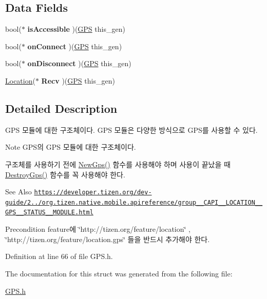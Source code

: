 \subsection*{Data Fields}
\begin{DoxyCompactItemize}
\item 
\hypertarget{struct__gps_ab422e6e9531279ce2cf7836d6fdad824}{bool($\ast$ {\bfseries is\-Accessible} )(\hyperlink{struct__gps}{G\-P\-S} this\-\_\-gen)}\label{struct__gps_ab422e6e9531279ce2cf7836d6fdad824}

\item 
\hypertarget{struct__gps_ac1e7688363e326df6919afc5d8cc848c}{bool($\ast$ {\bfseries on\-Connect} )(\hyperlink{struct__gps}{G\-P\-S} this\-\_\-gen)}\label{struct__gps_ac1e7688363e326df6919afc5d8cc848c}

\item 
\hypertarget{struct__gps_a7ad2cd5581984147767aa12d71a7ff74}{bool($\ast$ {\bfseries on\-Disconnect} )(\hyperlink{struct__gps}{G\-P\-S} this\-\_\-gen)}\label{struct__gps_a7ad2cd5581984147767aa12d71a7ff74}

\item 
\hypertarget{struct__gps_a983b023f987a119a6df5c57b8a998f61}{\hyperlink{GPS_8h_d1/d4f/struct__location}{Location}($\ast$ {\bfseries Recv} )(\hyperlink{struct__gps}{G\-P\-S} this\-\_\-gen)}\label{struct__gps_a983b023f987a119a6df5c57b8a998f61}

\end{DoxyCompactItemize}


\subsection{Detailed Description}
G\-P\-S 모듈에 대한 구조체이다. G\-P\-S 모듈은 다양한 방식으로 G\-P\-S를 사용할 수 있다. 

\begin{DoxyNote}{Note}
G\-P\-S의 G\-P\-S 모듈에 대한 구조체이다. \par
 구조체를 사용하기 전에 \hyperlink{GPS_8h_aaf1f2e8f7650a9ec24d3fedebd22e106}{New\-Gps()} 함수를 사용해야 하며 사용이 끝났을 때 \hyperlink{GPS_8h_a2c75d277f0c7f390ccc06701aa27660b}{Destroy\-Gps()} 함수를 꼭 사용해야 한다. 
\end{DoxyNote}
\begin{DoxySeeAlso}{See Also}
\href{https://developer.tizen.org/dev-guide/2.3.0/org.tizen.native.mobile.apireference/group__CAPI__LOCATION__GPS__STATUS__MODULE.html}{\tt https\-://developer.\-tizen.\-org/dev-\/guide/2../org.\-tizen.\-native.\-mobile.\-apireference/group\-\_\-\-\_\-\-C\-A\-P\-I\-\_\-\-\_\-\-L\-O\-C\-A\-T\-I\-O\-N\-\_\-\-\_\-\-G\-P\-S\-\_\-\-\_\-\-S\-T\-A\-T\-U\-S\-\_\-\-\_\-\-M\-O\-D\-U\-L\-E.\-html} 
\end{DoxySeeAlso}
\begin{DoxyPrecond}{Precondition}
feature에 \char`\"{}http\-://tizen.\-org/feature/location\char`\"{} , \char`\"{}http\-://tizen.\-org/feature/location.\-gps\char`\"{} 들을 반드시 추가해야 한다. 
\end{DoxyPrecond}


Definition at line 66 of file G\-P\-S.\-h.



The documentation for this struct was generated from the following file\-:\begin{DoxyCompactItemize}
\item 
\hyperlink{GPS_8h}{G\-P\-S.\-h}\end{DoxyCompactItemize}
